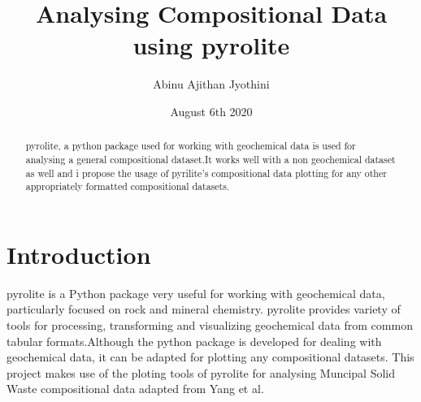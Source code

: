 \documentclass{article}
\title{Analysing Compositional Data using pyrolite }
\author{Abinu Ajithan Jyothini}
\date{August 6th 2020}
\begin{document}
\maketitle

\begin{abstract}
pyrolite, a python package used for working with geochemical data is used for analysing a general compositional dataset.It works well with a non geochemical dataset as well and i propose the usage of pyrilite's compositional data plotting for any other appropriately formatted compositional datasets. 
\end{abstract}

\section{Introduction}

pyrolite is a Python package very useful for  working with geochemical data, particularly focused on rock and mineral chemistry. pyrolite provides variety of tools for processing, transforming and visualizing geochemical data from common tabular formats.Although the python package is developed for dealing with geochemical data, it can be adapted for plotting any compositional datasets. This project makes use of the ploting tools of pyrolite for analysing Muncipal Solid Waste compositional data adapted from Yang et al\cite{yang2018comparison}.





 

\end{document}
